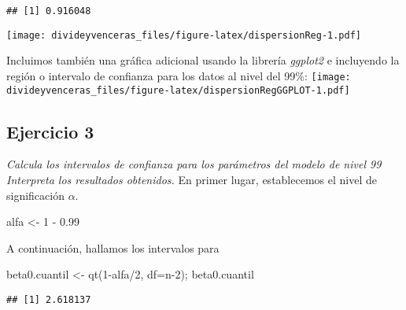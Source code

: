 \documentclass[
]{article}
\newenvironment{Shaded}{\begin{snugshade}}{\end{snugshade}}
\newcommand{\AttributeTok}[1]{\textcolor[rgb]{0.77,0.63,0.00}{#1}}
\newcommand{\DecValTok}[1]{\textcolor[rgb]{0.00,0.00,0.81}{#1}}
\newcommand{\FloatTok}[1]{\textcolor[rgb]{0.00,0.00,0.81}{#1}}
\newcommand{\FunctionTok}[1]{\textcolor[rgb]{0.00,0.00,0.00}{#1}}
\newcommand{\NormalTok}[1]{#1}
\newcommand{\OtherTok}[1]{\textcolor[rgb]{0.56,0.35,0.01}{#1}}
\newcommand{\SpecialCharTok}[1]{\textcolor[rgb]{0.00,0.00,0.00}{#1}}
\begin{document}
\begin{verbatim}
## [1] 0.916048
\end{verbatim}

\texttt{[image: divideyvenceras\_files/figure-latex/dispersionReg-1.pdf]}

Incluimos también una gráfica adicional usando la librería
\emph{ggplot2} e incluyendo la región o intervalo de confianza para los
datos al nivel del 99\%:
\texttt{[image: divideyvenceras\_files/figure-latex/dispersionRegGGPLOT-1.pdf]}

\hypertarget{ejercicio-3}{%
\subsection{Ejercicio 3}\label{ejercicio-3}}

\textit{Calcula los intervalos de confianza para los parámetros del modelo de nivel 99%
Interpreta los resultados obtenidos.} En primer lugar, establecemos el
nivel de significación \(\alpha\).

\begin{Shaded}
\begin{Highlighting}[]
\NormalTok{alfa }\OtherTok{\textless{}{-}} \DecValTok{1} \SpecialCharTok{{-}} \FloatTok{0.99}
\end{Highlighting}
\end{Shaded}

A continuación, hallamos los intervalos para

\begin{Shaded}
\begin{Highlighting}[]
\NormalTok{beta0.cuantil }\OtherTok{\textless{}{-}} \FunctionTok{qt}\NormalTok{(}\DecValTok{1}\SpecialCharTok{{-}}\NormalTok{alfa}\SpecialCharTok{/}\DecValTok{2}\NormalTok{, }\AttributeTok{df=}\NormalTok{n}\DecValTok{{-}2}\NormalTok{); beta0.cuantil}
\end{Highlighting}
\end{Shaded}

\begin{verbatim}
## [1] 2.618137
\end{verbatim}
\end{document}
